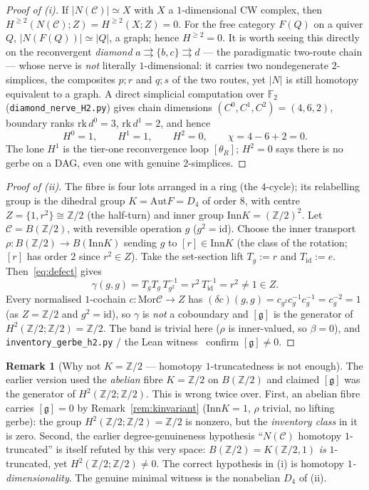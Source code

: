 \documentclass[11pt]{article}
\theoremstyle{definition}
\newtheorem{remark}[theorem]{Remark}
\newcommand{\C}{\mathcal{C}}
\newcommand{\Mor}{\mathrm{Mor}}
\newcommand{\id}{\mathrm{id}}
\newcommand{\Z}{\mathbb{Z}}
\newcommand{\Aut}{\mathrm{Aut}}
\newcommand{\Inn}{\mathrm{Inn}}
\newcommand{\Zc}{Z}
\newcommand{\gerbe}{\mathfrak{g}}
\begin{document}
\begin{proof}[Proof of (i)]
If $|N(\C)|\simeq X$ with $X$ a $1$-dimensional CW complex, then $H^{\ge2}(N(\C);\Zc)=H^{\ge2}(X;\Zc)
=0$. For the free category $F(Q)$ on a quiver $Q$, $|N(F(Q))|\simeq|Q|$, a graph; hence
$H^{\ge2}=0$. It is worth seeing this directly on the reconvergent \emph{diamond}
$a\rightrightarrows\{b,c\}\rightrightarrows d$ --- the paradigmatic two-route chain --- whose nerve
is \emph{not} literally $1$-dimensional: it carries two nondegenerate $2$-simplices, the composites
$p;r$ and $q;s$ of the two routes, yet $|N|$ is still homotopy equivalent to a graph. A direct
simplicial computation over $\mathbb F_2$ (\texttt{diamond\_nerve\_H2.py}) gives chain dimensions
$(C^0,C^1,C^2)=(4,6,2)$, boundary ranks $\mathrm{rk}\,d^0=3$, $\mathrm{rk}\,d^1=2$, and hence
\[
H^0=1,\qquad H^1=1,\qquad H^2=0,\qquad \chi=4-6+2=0.
\]
The lone $H^1$ is the tier-one reconvergence loop $[\theta_R]$; $H^2=0$ says there is no gerbe on a
DAG, even one with genuine $2$-simplices.
\end{proof}

\begin{proof}[Proof of (ii)]
The fibre is four lots arranged in a ring (the $4$-cycle); its relabelling group is the dihedral
group $K=\Aut F=D_4$ of order $8$, with centre $\Zc=\{1,r^2\}\cong\Z/2$ (the half-turn) and inner
group $\Inn K=(\Z/2)^2$. Let $\C=B(\Z/2)$, with reversible operation $g$ ($g^2=\id$). Choose the
inner transport $\rho:B(\Z/2)\to B(\Inn K)$ sending $g$ to $[r]\in\Inn K$ (the class of the
rotation; $[r]$ has order $2$ since $r^2\in\Zc$). Take the set-section lift $T_g:=r$ and
$T_{\id}:=e$. Then~\eqref{eq:defect} gives
\[
\gamma(g,g)=T_gT_g\,T_{g^2}^{-1}=r^2\,T_{\id}^{-1}=r^2\neq1\in\Zc.
\]
Every normalised $1$-cochain $c:\Mor\C\to\Zc$ has $(\delta c)(g,g)=c_{g^2}c_g^{-1}c_g^{-1}=c_g^{-2}
=1$ (as $\Zc=\Z/2$ and $g^2=\id$), so $\gamma$ is \emph{not} a coboundary and $[\gerbe]$ is the
generator of $H^2(\Z/2;\Z/2)=\Z/2$. The band is trivial here ($\rho$ is inner-valued, so
$\beta=0$), and \texttt{inventory\_gerbe\_h2.py} / the Lean witness~\cite{leanwit} confirm
$[\gerbe]\neq0$.
\end{proof}

\begin{remark}[Why not $K=\Z/2$ --- homotopy $1$-truncatedness is not enough]\label{rem:truncated}
The earlier version used the \emph{abelian} fibre $K=\Z/2$ on $B(\Z/2)$ and claimed $[\gerbe]$ was
the generator of $H^2(\Z/2;\Z/2)$. This is wrong twice over. First, an abelian fibre carries
$[\gerbe]=0$ by Remark~\ref{rem:kinvariant} ($\Inn K=1$, $\rho$ trivial, no lifting gerbe): the
group $H^2(\Z/2;\Z/2)=\Z/2$ is nonzero, but the \emph{inventory class} in it is zero. Second, the
earlier degree-genuineness hypothesis ``$N(\C)$ homotopy $1$-truncated'' is itself refuted by this
very space: $B(\Z/2)=K(\Z/2,1)$ \emph{is} $1$-truncated, yet $H^2(\Z/2;\Z/2)\ne0$. The correct
hypothesis in (i) is homotopy \emph{$1$-dimensionality}. The genuine minimal witness is the
nonabelian $D_4$ of (ii).
\end{remark}
\end{document}
